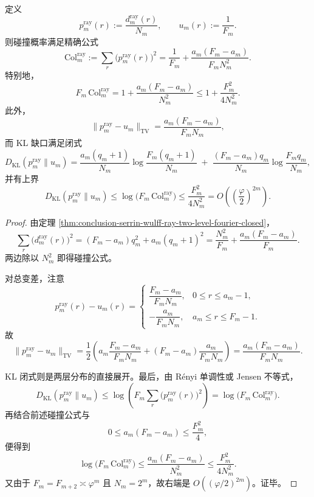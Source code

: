 \begin{corollary}\label{cor:conclusion-serrin-wulff-ray-collision-tv-kl-closed}
定义
\[
p_m^{\mathrm{ray}}(r):=\frac{d_m^{\mathrm{ray}}(r)}{N_m},
\qquad
u_m(r):=\frac1{F_m}.
\]
则碰撞概率满足精确公式
\[
\mathrm{Col}_m^{\mathrm{ray}}
:=
\sum_{r}\bigl(p_m^{\mathrm{ray}}(r)\bigr)^2
=
\frac1{F_m}
+\frac{a_m(F_m-a_m)}{F_mN_m^2}.
\]
特别地，
\[
F_m\,\mathrm{Col}_m^{\mathrm{ray}}
=
1+\frac{a_m(F_m-a_m)}{N_m^2}
\le
1+\frac{F_m^2}{4N_m^2}.
\]
此外，
\[
\bigl\|p_m^{\mathrm{ray}}-u_m\bigr\|_{\mathrm{TV}}
=
\frac{a_m(F_m-a_m)}{F_mN_m},
\]
而 KL 缺口满足闭式
\[
D_{\mathrm{KL}}(p_m^{\mathrm{ray}}\|u_m)
=
\frac{a_m(q_m+1)}{N_m}\log\frac{F_m(q_m+1)}{N_m}
\;+\;
\frac{(F_m-a_m)q_m}{N_m}\log\frac{F_mq_m}{N_m},
\]
并有上界
\[
D_{\mathrm{KL}}(p_m^{\mathrm{ray}}\|u_m)
\le
\log\!\bigl(F_m\,\mathrm{Col}_m^{\mathrm{ray}}\bigr)
\le
\frac{F_m^2}{4N_m^2}
=
O\!\left(\left(\frac{\varphi}{2}\right)^{2m}\right).
\]
\end{corollary}
\begin{proof}
由定理 \ref{thm:conclusion-serrin-wulff-ray-two-level-fourier-closed}，
\[
\sum_r \bigl(d_m^{\mathrm{ray}}(r)\bigr)^2
=
(F_m-a_m)q_m^2+a_m(q_m+1)^2
=
\frac{N_m^2}{F_m}+\frac{a_m(F_m-a_m)}{F_m}.
\]
两边除以 \(N_m^2\) 即得碰撞公式。

对总变差，注意
\[
p_m^{\mathrm{ray}}(r)-u_m(r)=
\begin{cases}
\dfrac{F_m-a_m}{F_mN_m}, & 0\le r\le a_m-1,\\[8pt]
-\dfrac{a_m}{F_mN_m}, & a_m\le r\le F_m-1.
\end{cases}
\]
故
\[
\bigl\|p_m^{\mathrm{ray}}-u_m\bigr\|_{\mathrm{TV}}
=
\frac12\left(
a_m\frac{F_m-a_m}{F_mN_m}
+(F_m-a_m)\frac{a_m}{F_mN_m}
\right)
=
\frac{a_m(F_m-a_m)}{F_mN_m}.
\]

KL 闭式则是两层分布的直接展开。最后，由 Rényi 单调性或 Jensen 不等式，
\[
D_{\mathrm{KL}}(p_m^{\mathrm{ray}}\|u_m)
\le
\log\!\left(F_m\sum_r \bigl(p_m^{\mathrm{ray}}(r)\bigr)^2\right)
=
\log\!\bigl(F_m\,\mathrm{Col}_m^{\mathrm{ray}}\bigr).
\]
再结合前述碰撞公式与
\[
0\le a_m(F_m-a_m)\le \frac{F_m^2}{4},
\]
便得到
\[
\log\!\bigl(F_m\,\mathrm{Col}_m^{\mathrm{ray}}\bigr)
\le
\frac{a_m(F_m-a_m)}{N_m^2}
\le
\frac{F_m^2}{4N_m^2}.
\]
又由于 \(F_m=F_{m+2}\asymp \varphi^m\) 且 \(N_m=2^m\)，故右端是 \(O((\varphi/2)^{2m})\)。证毕。
\end{proof}

